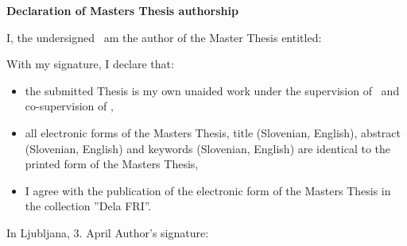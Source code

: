 \vspace*{1cm}
\begin{center}
{\Large \textbf{\sc Declaration of Masters Thesis authorship}}
\end{center}

\vspace{1cm}
\noindent I, the undersigned \tauthor\ am the author of the Master Thesis entitled:

\vspace{0.5cm}
\begin{center}
\emph{\ttitleEn}
\end{center}

\vspace{1cm}
\noindent With my signature, I declare that:
\begin{itemize}
	\item the submitted Thesis is my own unaided work under the supervision of \mysupervisor\ and co-supervision of \mycosupervisor,

	\item all electronic forms of the Masters Thesis, title (Slovenian, English), abstract (Slovenian, English) and keywords (Slovenian, English) are identical to the printed form of the Masters Thesis,
	\item I agree with the publication of the electronic form of the Masters Thesis in the collection ''Dela FRI''. 
\end{itemize}

\vspace{1cm}
\noindent In Ljubljana, 3. April \myyear \hfill Author's signature: